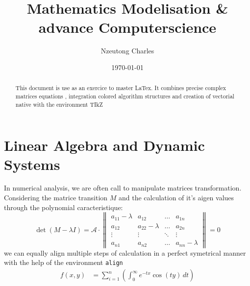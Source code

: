 \documentclass[12pt, a4paper]{article}
\title{\color{darkblue}\Huge\bfseries Mathematics Modelisation \& advance Computerscience}
\author{\Large Nzeutong Charles}
\date{\today}
\begin{document}
\maketitle
\begin{abstract}
    This document is use as an exercice to master LaTex. It combines precise complex matrices equations , integration colored algorithm structures and creation of vectorial native with the environment TIkZ
\end{abstract}
\section{Linear Algebra and Dynamic Systems}
In numerical analysis, we are often call to manipulate matrices transformation. Considering the matrice transition $M$ and the calculation of it's aigen values through the polynomial caracteristique:
\begin{equation}
    \det(M-\lambda I) = \mathcal{A}\cdot
    \begin{Vmatrix}
    a_{11}-\lambda & a_{12} & \dots & a_{1n}\\
    a_{12} & a_{22} - \lambda  & \dots & a_{2n}\\
    \vdots & \vdots & \ddots & \vdots\\
    a_{n1} & a_{n2} & \dots & a_{nn} - \lambda
    \end{Vmatrix}=0
\end{equation}
we can equally align multiple steps of calculation in a perfect symetrical manner with the help of the environment \texttt{align}
\begin{align}
f(x, y)&= \sum_{i=1}^{n} \left(\int_{0}^{\infty} e^{-tx} \cos(ty) \, dt \right) \nonumber\\
\end{align}
\end{document}
